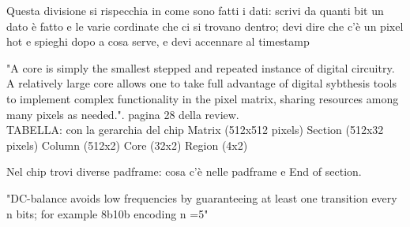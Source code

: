         Questa divisione si rispecchia in come sono fatti i dati: scrivi da quanti bit un
        dato è fatto e le varie cordinate che ci si trovano dentro; devi dire che c'è un pixel hot
        e spieghi dopo a cosa serve, e devi accennare al timestamp

        "A core is simply the smallest stepped and repeated instance of digital circuitry.
        A relatively large core allows one to take full advantage of digital sybthesis tools
        to implement complex functionality in the pixel matrix, sharing resources among
        many pixels as needed.".
        pagina 28 della review.\\



        TABELLA: con la gerarchia del chip
        Matrix (512x512 pixels)
        Section (512x32 pixels)
        Column (512x2)
        Core (32x2)
        Region (4x2)

        Nel chip trovi diverse padframe: cosa c'è nelle padframe e End of section.

        "DC-balance avoids low frequencies by guaranteeing at least one transition every
        n bits; for example 8b10b encoding n =5"

